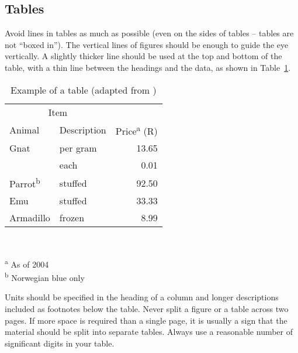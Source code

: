 \documentclass[a5paper, 10pt]{article}
\begin{document}
\subsection{Tables}
Avoid lines in tables as much as possible (even on the sides
of tables -- tables are not ``boxed in'').  The vertical
lines of figures should be enough to guide the eye vertically.  A
slightly thicker line should be used at the top and bottom of the
table, with a thin line between the headings and the data, as shown in
Table~\ref{tab:tabexample}.

\begin{table}[htbp]
  \centering
  \caption{Example of a table (adapted from \citet{fear})}
  \label{tab:tabexample}
  \begin{minipage}{0.5\textwidth}
    \begin{centering}
      \begin{tabular}{@{}llr@{}} \toprule 
        \multicolumn{2}{c}{Item}                                               \\ 
        \cmidrule(r){1-2} 
        Animal                    & Description & Price\textsuperscript{a} (R) \\ 
        \midrule 
        Gnat                      & per gram    & \num{13.65}                  \\ 
                                  & each        & \num{0.01}                   \\ 
        Parrot\textsuperscript{b} & stuffed     & \num{92.50}                  \\ 
        Emu                       & stuffed     & \num{33.33}                  \\ 
        Armadillo                 & frozen      & \num{8.99}                   \\ 
        \bottomrule 
      \end{tabular}                                                            \\
    \end{centering} 
    \vspace{1em}
    \textsuperscript{a} As of 2004                                             \\
    \textsuperscript{b} Norwegian blue only
  \end{minipage}
\end{table}

Units should be specified in the heading of a column and longer descriptions included as footnotes below the table.
Never split a figure or a table across two pages.
If more space is required than a single page, it is usually a sign that the material should be split into separate tables.
Always use a reasonable number of significant digits in your table.
\end{document}

